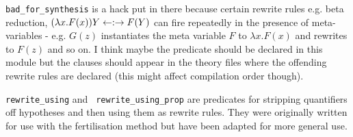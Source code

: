 \begin{description}
  {\tt bad\_for\_synthesis} is a hack put
  in there because certain rewrite rules e.g.
  beta reduction, $(\lambda x. F(x)) Y \leftarrow:\rightarrow
  F(Y)$ can fire repeatedly in the presence of
  meta-variables - e.g. $G(z)$ instantiates the
  meta variable $F$ to $\lambda x. F(x)$ and rewrites to $F(z)$ and so
  on.  I think maybe the predicate should be declared in this module
  but the clauses should appear in the theory files where the
  offending rewrite rules are declared (this might affect compilation
  order though).
  
  {\tt rewrite\_using} and {\tt
    rewrite\_using\_prop} are predicates
  for stripping quantifiers off hypotheses and then
  using them as rewrite rules.  They were
  originally written for use with the fertilisation
  method but have been adapted for more
  general use.


\end{description}
